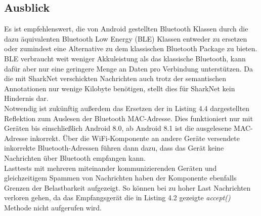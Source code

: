 \subsection{Ausblick}
Es ist empfehlenswert, die von Android gestellten Bluetooth Klassen durch die dazu äquivalenten Bluetooth Low Energy (BLE) Klassen entweder zu ersetzen oder zumindest eine Alternative zu dem klassischen Bluetooth Package zu bieten. BLE verbraucht weit weniger Akkuleistung als das klassische Bluetooth, kann dafür aber nur eine geringere Menge an Daten pro Verbindung unterstützen. Da die mit SharkNet verschickten Nachrichten auch trotz der semantischen Annotationen nur wenige Kilobyte benötigen, stellt dies für SharkNet kein Hindernis dar.
\\Notwendig ist zukünftig außerdem das Ersetzen der in Listing 4.4 dargestellten Reflektion zum Auslesen der Bluetooth MAC-Adresse. Dies funktioniert nur mit Geräten bis einschließlich Android 8.0, ab Android 8.1 ist die ausgelesene MAC-Adresse inkorrekt. Über die WiFi-Komponente an andere Geräte versendete inkorrekte Bluetooth-Adressen führen dann dazu, dass das Gerät keine Nachrichten über Bluetooth empfangen kann. 
\\Lasttests mit mehreren miteinander kommunizierenden Geräten und gleichzeitigem Spammen von Nachrichten haben der Komponente ebenfalls Grenzen der Belastbarkeit aufgezeigt. So können bei zu hoher Last Nachrichten verloren gehen, da das Empfangsgerät die in Listing 4.2 gezeigte \textit{accept()} Methode nicht aufgerufen wird. 
\newpage

